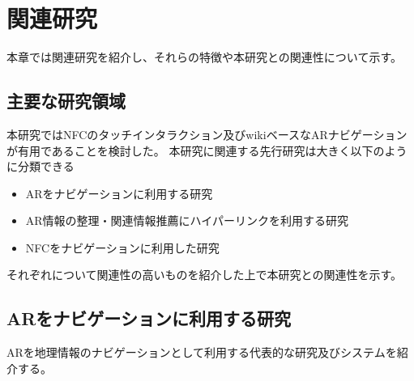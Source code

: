 \chapter{関連研究}
\label{chap:relatedResearch}

本章では関連研究を紹介し、それらの特徴や本研究との関連性について示す。

\newpage


\section{主要な研究領域}
本研究ではNFCのタッチインタラクション及びwikiベースなARナビゲーションが有用であることを検討した。
本研究に関連する先行研究は大きく以下のように分類できる
\begin{itemize}
  \item ARをナビゲーションに利用する研究
  \item AR情報の整理・関連情報推薦にハイパーリンクを利用する研究
  \item NFCをナビゲーションに利用した研究
\end{itemize}
それぞれについて関連性の高いものを紹介した上で本研究との関連性を示す。

\section{ARをナビゲーションに利用する研究}
ARを地理情報のナビゲーションとして利用する代表的な研究及びシステムを紹介する。




